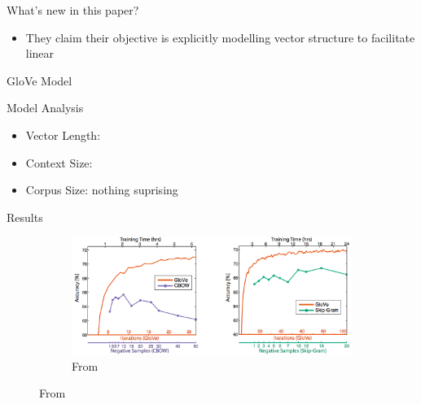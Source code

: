 \begin{frame}{What's new in this paper?}
  \begin{itemize}
  \item They claim their objective is explicitly modelling vector structure to facilitate linear 
  \end{itemize}
\end{frame}

\begin{frame}{GloVe Model}
\end{frame}


\begin{frame}{Model Analysis}
  \begin{itemize}
  \item Vector Length:
  \item Context Size: 
  \item Corpus Size: nothing suprising
  \end{itemize}
\end{frame}

\begin{frame}{Results}
  \begin{figure}
    \begin{figure}
      \includegraphics[scale=0.27]{images/gloveVSword2vec.png}
      \caption{From}
    \end{figure}
  \end{figure}
\end{frame}

